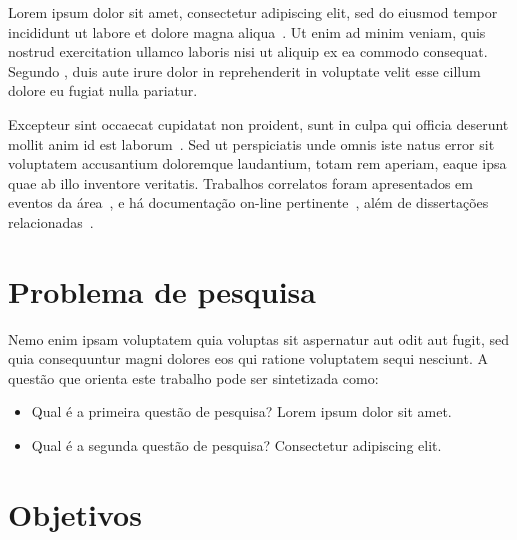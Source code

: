 
Lorem ipsum dolor sit amet, consectetur adipiscing elit, sed do eiusmod tempor
incididunt ut labore et dolore magna aliqua~\parencite{exemplo-livro}. Ut enim ad
minim veniam, quis nostrud exercitation ullamco laboris nisi ut aliquip ex ea
commodo consequat. Segundo \textcite{exemplo-artigo}, duis aute irure dolor in
reprehenderit in voluptate velit esse cillum dolore eu fugiat nulla pariatur.

Excepteur sint occaecat cupidatat non proident, sunt in culpa qui officia
deserunt mollit anim id est laborum~\parencite{exemplo-artigo, exemplo-livro}. Sed
ut perspiciatis unde omnis iste natus error sit voluptatem accusantium doloremque
laudantium, totam rem aperiam, eaque ipsa quae ab illo inventore veritatis.
Trabalhos correlatos foram apresentados em eventos da
área~\parencite{exemplo-evento}, e há documentação on-line
pertinente~\parencite{exemplo-site}, além de dissertações
relacionadas~\parencite{exemplo-dissertacao}.

\section{Problema de pesquisa}

Nemo enim ipsam voluptatem quia voluptas sit aspernatur aut odit aut fugit, sed
quia consequuntur magni dolores eos qui ratione voluptatem sequi nesciunt. A
questão que orienta este trabalho pode ser sintetizada como:

\begin{itemize}
  \item Qual é a primeira questão de pesquisa? Lorem ipsum dolor sit amet.
  \item Qual é a segunda questão de pesquisa? Consectetur adipiscing elit.
\end{itemize}

\section{Objetivos}

